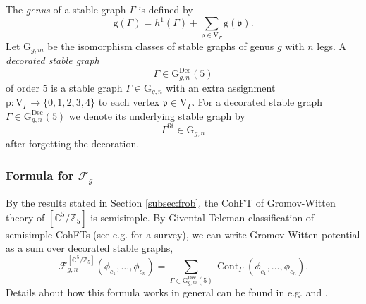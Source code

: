 \documentclass[12pt]{amsart}
\numberwithin{equation}{section}
\begin{document}
The \textit{genus} of a stable graph $\Gamma$ is defined by
\begin{equation*}
\mathrm{g}(\Gamma)=h^1(\Gamma)+\sum_{\mathfrak{v}\in\mathrm{V}_{\Gamma}}\mathrm{g}(\mathfrak{v}).
\end{equation*}
Let $\mathrm{G}_{g,m}$ be the isomorphism classes of stable graphs of genus $g$ with $n$ legs. A \textit{decorated stable graph} $$\Gamma\in\mathrm{G}_{g,n}^{\text{Dec}}(5)$$ of order $5$ is a stable graph $\Gamma\in\mathrm{G}_{g,n}$ with an extra assignment $\mathrm{p}: \mathrm{V}_{\Gamma}\rightarrow \{0,1, 2, 3,4\}$ to each vertex $\mathfrak{v}\in\mathrm{V}_{\Gamma}$. For a decorated stable graph $\Gamma\in\mathrm{G}_{g,n}^{\text{Dec}}(5)$ we denote its underlying stable graph by $$\Gamma^{\mathrm{St}}\in\mathrm{G}_{g,n}$$ after forgetting the decoration.

\subsubsection{Formula for $\mathcal{F}_g$}
By the results stated in Section \ref{subsec:frob}, the CohFT of Gromov-Witten theory of $[\mathbb{C}^5/\mathbb{Z}_5]$ is semisimple. By Givental-Teleman classification of semisimple CohFTs (see e.g. \cite{Picm} for a survey), we can write Gromov-Witten potential as a sum over decorated stable graphs,
\begin{equation}\label{eqn:formula_Fg}
\mathcal{F}_{g, n}^{\left[\mathbb{C}^{5} / \mathbb{Z}_{5}\right]}\left(\phi_{c_{1}}, \ldots, \phi_{c_{n}}\right)=\sum_{\Gamma\in\mathrm{G}_{g,m}^{\text{Dec}}(5)}\operatorname{Cont}_{\Gamma}\left(\phi_{c_{1}}, \ldots, \phi_{c_{n}}\right).
\end{equation}
Details about how this formula works in general can be found in e.g. \cite{ppz} and \cite{lho-p2}.
\end{document}
